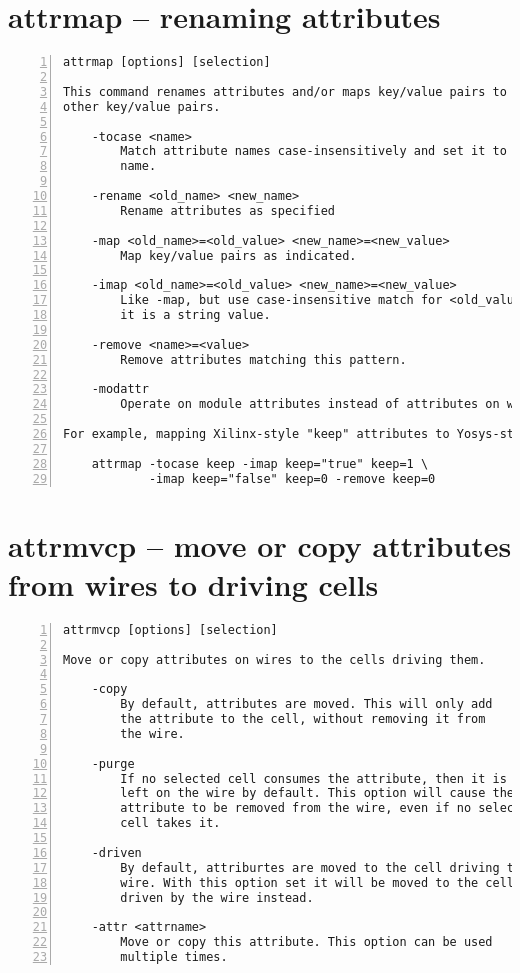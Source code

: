 \section{attrmap -- renaming attributes}
\label{cmd:attrmap}
\begin{lstlisting}[numbers=left,frame=single]
    attrmap [options] [selection]

This command renames attributes and/or maps key/value pairs to
other key/value pairs.

    -tocase <name>
        Match attribute names case-insensitively and set it to the specified
        name.

    -rename <old_name> <new_name>
        Rename attributes as specified

    -map <old_name>=<old_value> <new_name>=<new_value>
        Map key/value pairs as indicated.

    -imap <old_name>=<old_value> <new_name>=<new_value>
        Like -map, but use case-insensitive match for <old_value> when
        it is a string value.

    -remove <name>=<value>
        Remove attributes matching this pattern.

    -modattr
        Operate on module attributes instead of attributes on wires and cells.

For example, mapping Xilinx-style "keep" attributes to Yosys-style:

    attrmap -tocase keep -imap keep="true" keep=1 \
            -imap keep="false" keep=0 -remove keep=0
\end{lstlisting}

\section{attrmvcp -- move or copy attributes from wires to driving cells}
\label{cmd:attrmvcp}
\begin{lstlisting}[numbers=left,frame=single]
    attrmvcp [options] [selection]

Move or copy attributes on wires to the cells driving them.

    -copy
        By default, attributes are moved. This will only add
        the attribute to the cell, without removing it from
        the wire.

    -purge
        If no selected cell consumes the attribute, then it is
        left on the wire by default. This option will cause the
        attribute to be removed from the wire, even if no selected
        cell takes it.

    -driven
        By default, attriburtes are moved to the cell driving the
        wire. With this option set it will be moved to the cell
        driven by the wire instead.

    -attr <attrname>
        Move or copy this attribute. This option can be used
        multiple times.
\end{lstlisting}

